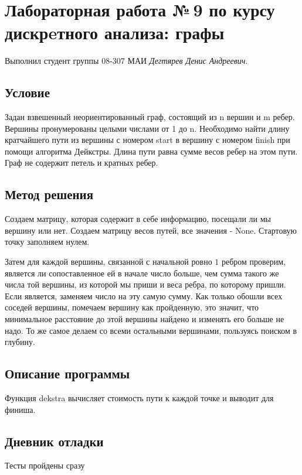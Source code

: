 \documentclass[12pt]{article}
\begin{document}
\section*{Лабораторная работа №\,9 по курсу дискрeтного анализа: графы}

Выполнил студент группы 08-307 МАИ \textit{Дегтярев Денис Андреевич}.

\subsection*{Условие}

Задан взвешенный неориентированный граф, состоящий из n вершин и m ребер. Вершины пронумерованы целыми числами от 1 до n. 
Необходимо найти длину кратчайшего пути из вершины с номером start в вершину с номером finish при помощи алгоритма Дейкстры. 
Длина пути равна сумме весов ребер на этом пути. Граф не содержит петель и кратных ребер.

\subsection*{Метод решения}

Создаем матрицу, которая содержит в себе информацию, посещали ли мы вершину или нет.
Создаем матрицу весов путей, все значения - None.
Стартовую точку заполняем нулем.

Затем для каждой вершины, связанной с начальной ровно $1$ 
ребром проверим, является ли сопоставленное ей в начале число больше, чем 
сумма такого же числа той вершины, из которой мы приши и веса ребра, по 
которому пришли. Если является, заменяем число на эту самую сумму. Как 
только обошли всех соседей вершины, помечаем вершину как пройденную, это 
значит, что минимальное расстояние до этой вершины найдено и изменять его 
больше не надо. То же самое делаем со всеми остальными вершинами, пользуясь 
поиском в глубину.

\subsection*{Описание программы}

Функция dekstra вычисляет стоимость пути к каждой точке и выводит для финиша.

\subsection*{Дневник отладки}  

Тесты пройдены сразу
\end{document}
